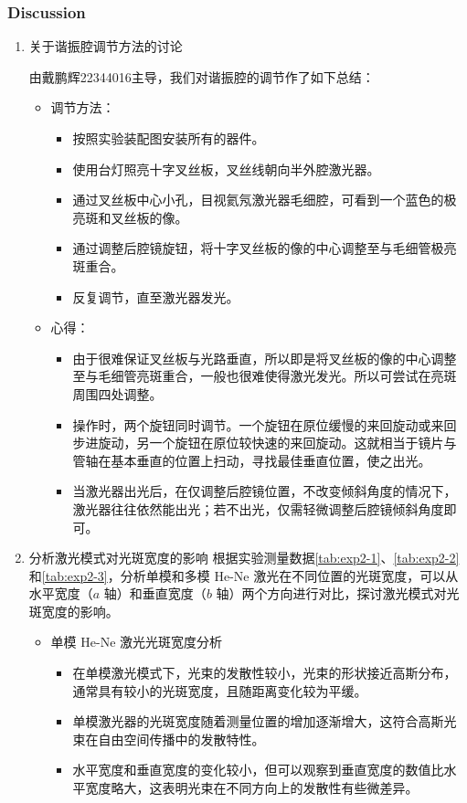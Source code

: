 \subsubsection{Discussion}
\begin{enumerate}
	\item 关于谐振腔调节方法的讨论
	
	由戴鹏辉22344016主导，我们对谐振腔的调节作了如下总结：
	\begin{itemize}
		\item 调节方法：
		\begin{itemize}
			\item 按照实验装配图安装所有的器件。
			\item 使用台灯照亮十字叉丝板，叉丝线朝向半外腔激光器。
			\item 通过叉丝板中心小孔，目视氦氖激光器毛细腔，可看到一个蓝色的极亮斑和叉丝板的像。
			\item 通过调整后腔镜旋钮，将十字叉丝板的像的中心调整至与毛细管极亮斑重合。
			\item 反复调节，直至激光器发光。
		\end{itemize}
		
		\item 心得：
		\begin{itemize}
			\item 由于很难保证叉丝板与光路垂直，所以即是将叉丝板的像的中心调整至与毛细管亮斑重合，一般也很难使得激光发光。所以可尝试在亮斑周围四处调整。
			\item 操作时，两个旋钮同时调节。一个旋钮在原位缓慢的来回旋动或来回步进旋动，另一个旋钮在原位较快速的来回旋动。这就相当于镜片与管轴在基本垂直的位置上扫动，寻找最佳垂直位置，使之出光。
			\item 当激光器出光后，在仅调整后腔镜位置，不改变倾斜角度的情况下，激光器往往依然能出光；若不出光，仅需轻微调整后腔镜倾斜角度即可。
		\end{itemize}
	\end{itemize}
	
	\item 分析激光模式对光斑宽度的影响
	根据实验测量数据\cref{tab:exp2-1}、\cref{tab:exp2-2}和\cref{tab:exp2-3}，分析单模和多模 He-Ne 激光在不同位置的光斑宽度，可以从水平宽度（\(a\) 轴）和垂直宽度（\(b\) 轴）两个方向进行对比，探讨激光模式对光斑宽度的影响。
	\begin{itemize}
		\item 单模 He-Ne 激光光斑宽度分析
		\begin{itemize}
			\item 在单模激光模式下，光束的发散性较小，光束的形状接近高斯分布，通常具有较小的光斑宽度，且随距离变化较为平缓。
			\item 单模激光器的光斑宽度随着测量位置的增加逐渐增大，这符合高斯光束在自由空间传播中的发散特性。
			\item 水平宽度和垂直宽度的变化较小，但可以观察到垂直宽度的数值比水平宽度略大，这表明光束在不同方向上的发散性有些微差异。
		\end{itemize}
		

\end{itemize}
\end{enumerate}
